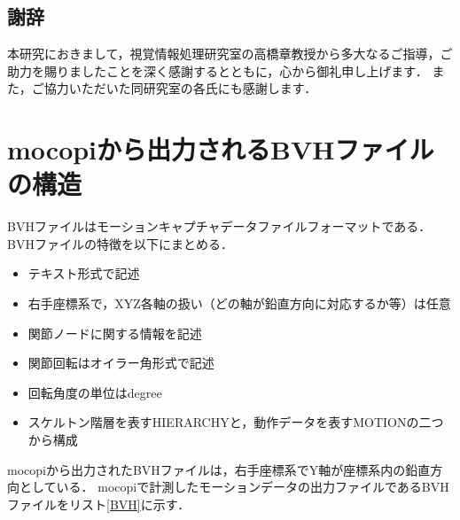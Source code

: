 \documentclass[a4j, fleqn, 12pt]{jsreport}
\begin{document}
\section*{謝辞}
本研究におきまして，視覚情報処理研究室の高橋章教授から多大なるご指導，ご助力を賜りましたことを深く感謝するとともに，心から御礼申し上げます．
また，ご協力いただいた同研究室の各氏にも感謝します．

\begin{thebibliography}{99}
  \small{
  }
\end{thebibliography}

\appendix
\chapter{mocopiから出力されるBVHファイルの構造}
BVHファイルはモーションキャプチャデータファイルフォーマットである．
BVHファイルの特徴を以下にまとめる．
\begin{itemize}
  \item テキスト形式で記述
  \item 右手座標系で，XYZ各軸の扱い（どの軸が鉛直方向に対応するか等）は任意
  \item 関節ノードに関する情報を記述
  \item 関節回転はオイラー角形式で記述
  \item 回転角度の単位はdegree
  \item スケルトン階層を表すHIERARCHYと，動作データを表すMOTIONの二つから構成
\end{itemize}
mocopiから出力されたBVHファイルは，右手座標系でY軸が座標系内の鉛直方向としている．
mocopiで計測したモーションデータの出力ファイルであるBVHファイルをリスト\ref{BVH}に示す．
\end{document}
